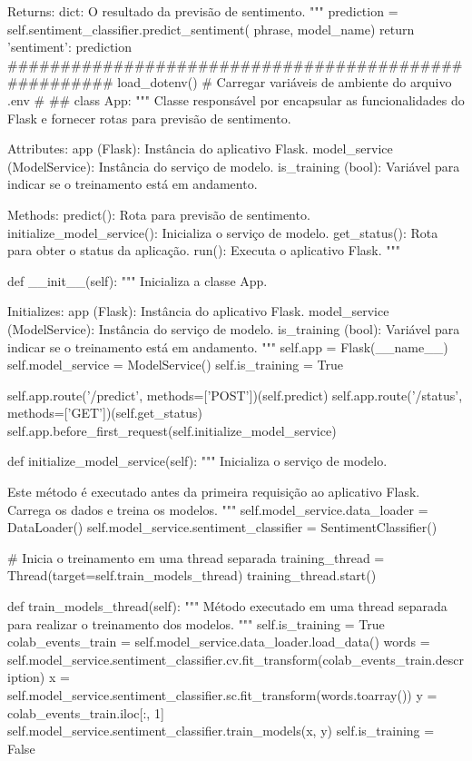 \begin{codigo}[caption={API para engine de classificação de sentimento baseado em NLP utilizando o Flask como middleware http}, label={codigo:sentiment_api}, language=Python, breaklines=true]
        Returns:
            dict: O resultado da previsão de sentimento.
        """
        prediction = self.sentiment_classifier.predict_sentiment(
            phrase, model_name)
        return {'sentiment': prediction}
#####################################################
load_dotenv()  # Carregar variáveis de ambiente do arquivo .env
#
##
class App:
    """
    Classe responsável por encapsular as funcionalidades do Flask e fornecer rotas para previsão de sentimento.

    Attributes:
        app (Flask): Instância do aplicativo Flask.
        model_service (ModelService): Instância do serviço de modelo.
        is_training (bool): Variável para indicar se o treinamento está em andamento.

    Methods:
        predict(): Rota para previsão de sentimento.
        initialize_model_service(): Inicializa o serviço de modelo.
        get_status(): Rota para obter o status da aplicação.
        run(): Executa o aplicativo Flask.
    """

    def __init__(self):
        """
        Inicializa a classe App.

        Initializes:
            app (Flask): Instância do aplicativo Flask.
            model_service (ModelService): Instância do serviço de modelo.
            is_training (bool): Variável para indicar se o treinamento está em andamento.
        """
        self.app = Flask(__name__)
        self.model_service = ModelService()
        self.is_training = True

        self.app.route('/predict', methods=['POST'])(self.predict)
        self.app.route('/status', methods=['GET'])(self.get_status)
        self.app.before_first_request(self.initialize_model_service)    

    def initialize_model_service(self):
        """
        Inicializa o serviço de modelo.

        Este método é executado antes da primeira requisição ao aplicativo Flask.
        Carrega os dados e treina os modelos.
        """
        self.model_service.data_loader = DataLoader()
        self.model_service.sentiment_classifier = SentimentClassifier()

        # Inicia o treinamento em uma thread separada
        training_thread = Thread(target=self.train_models_thread)
        training_thread.start()

    def train_models_thread(self):
        """
        Método executado em uma thread separada para realizar o treinamento dos modelos.
        """
        self.is_training = True
        colab_events_train = self.model_service.data_loader.load_data()
        words = self.model_service.sentiment_classifier.cv.fit_transform(colab_events_train.description)
        x = self.model_service.sentiment_classifier.sc.fit_transform(words.toarray())
        y = colab_events_train.iloc[:, 1]
        self.model_service.sentiment_classifier.train_models(x, y)
        self.is_training = False


\end{codigo}
